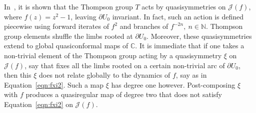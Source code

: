 \documentclass[12pt]{amsart}
\makeatletter
\newtheorem*{rmk}{Remark}
\newtheorem*{ex}{Example}
\newcommand{\C}{\mathbb{C}}
\newcommand{\N}{\mathbb{N}}
\newcommand{\ra}{\rightarrow}
\newcommand{\hC}{\widehat{\C}}
\newcommand{\J}{\mathcal{J}}
\newcommand{\co}{\colon}
\renewenvironment{ex}[1][\examplename]{%
  \par
  \pushQED{\qed}%
  \normalfont\topsep6\p@ \@plus6\p@ \trivlist
  \item[\hskip\labelsep\itshape
        \bfseries #1\@addpunct{:}]%
  \ignorespaces
}{%
  \popQED\endtrivlist
}
\renewenvironment{ex}{%
  \normalfont\topsep6\p@ \@plus6\p@ \trivlist
  \item[\hskip\labelsep\bfseries Example:]%
  \ignorespaces
}{%
  \endtrivlist
}
\makeatother
\begin{document}
\begin{ex}
In~\cite[Lemma~5.4]{LM}, it is shown that the Thompson group $T$ acts by quasisymmetries on $\J(f)$, where $f(z)=z^2-1$, leaving $\partial U_0$ invariant. In fact, such an action is defined piecewise using forward iterates of $f^2$ and branches of $f^{-2n},\ n\in\N$. Thompson group elements shuffle the limbs rooted at $\partial U_0$. Moreover, these quasisymmetries extend to global quasiconformal maps of $\C$. It is immediate that if one takes a non-trivial element of the Thompson group acting by a quasisymmetry $\xi$ on $\J(f)$, say that fixes all the limbs rooted on a certain non-trivial arc of $\partial U_0$, then this $\xi$ does not relate globally to the dynamics of $f$, say as in Equation~\eqref{eqn:fxi2}. Such a map $\xi$ has degree one however. Post-composing $\xi$ with $f$ produces a quasiregular map of degree two that does not satisfy Equation~\eqref{eqn:fxi2} on $\J(f)$.   


\end{ex}


\end{document}
